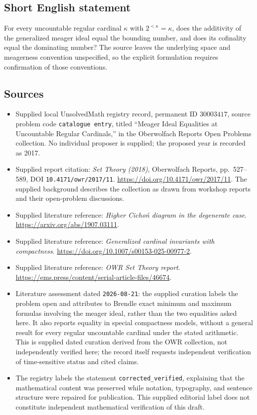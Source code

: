 \documentclass[11pt]{article}
\begin{document}
\subsection{Short English statement}
For every uncountable regular cardinal \(\kappa\) with \(2^{<\kappa}=\kappa\), does the additivity of the generalized meager ideal equal the bounding number, and does its cofinality equal the dominating number? The source leaves the underlying space and meagerness convention unspecified, so the explicit formulation requires confirmation of those conventions.
\subsection{Sources}
\begin{itemize}
\item Supplied local UnsolvedMath registry record, permanent ID \(30003417\), source problem code \texttt{catalogue entry}, titled ``Meager Ideal Equalities at Uncountable Regular Cardinals,'' in the Oberwolfach Reports Open Problems collection. No individual proposer is supplied; the proposed year is recorded as 2017.
\item Supplied report citation: \emph{Set Theory (2018)}, Oberwolfach Reports, pp.\ 527--589, DOI \texttt{10.4171/owr/2017/11}. \url{https://doi.org/10.4171/owr/2017/11}. The supplied background describes the collection as drawn from workshop reports and their open-problem discussions.
\item Supplied literature reference: \emph{Higher Cicho\'n diagram in the degenerate case}. \url{https://arxiv.org/abs/1907.03111}.
\item Supplied literature reference: \emph{Generalized cardinal invariants with compactness}. \url{https://doi.org/10.1007/s00153-025-00977-2}.
\item Supplied literature reference: \emph{OWR Set Theory report}. \url{https://ems.press/content/serial-article-files/46674}.
\item Literature assessment dated \texttt{2026-08-21}: the supplied curation labels the problem open and attributes to Brendle exact minimum and maximum formulas involving the meager ideal, rather than the two equalities asked here. It also reports equality in special compactness models, without a general result for every regular uncountable cardinal under the stated arithmetic. This is supplied dated curation derived from the OWR collection, not independently verified here; the record itself requests independent verification of time-sensitive status and cited claims.
\item The registry labels the statement \texttt{corrected\_verified}, explaining that the mathematical content was preserved while notation, typography, and sentence structure were repaired for publication. This supplied editorial label does not constitute independent mathematical verification of this draft.
\end{itemize}
\end{document}
